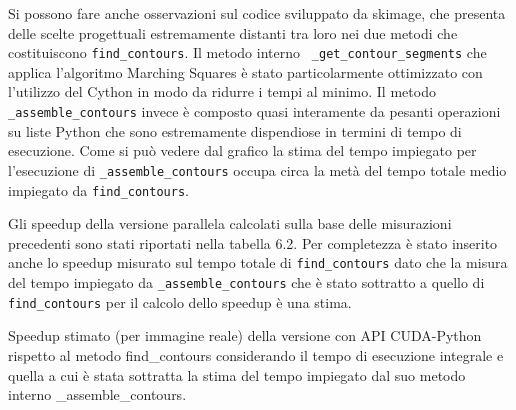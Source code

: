 \documentclass[12pt,a4paper]{report}
\begin{document}
{%
\begin{figure}[H]
\centering
\begin{floatrow}[1]
\end{floatrow}
\end{figure} 

Si possono fare anche osservazioni sul codice sviluppato da skimage, che presenta delle scelte progettuali estremamente distanti tra loro nei due metodi che costituiscono \verb|find_contours|. Il metodo interno \verb| _get_contour_segments| che applica l'algoritmo Marching Squares è stato particolarmente ottimizzato con l'utilizzo del Cython in modo da ridurre i tempi al minimo. Il metodo \verb|_assemble_contours| invece è composto quasi interamente da pesanti operazioni su liste Python che sono estremamente dispendiose in termini di tempo di esecuzione. Come si può vedere dal grafico la stima del tempo impiegato per l'esecuzione di \verb|_assemble_contours| occupa circa la metà del tempo totale medio impiegato da \verb|find_contours|.
\newpage

Gli speedup della versione parallela calcolati sulla base delle misurazioni precedenti sono stati riportati nella tabella 6.2. Per completezza è stato inserito anche lo speedup misurato sul tempo totale di \verb|find_contours| dato che la misura del tempo impiegato da \verb|_assemble_contours| che è stato sottratto a quello di \verb|find_contours| per il calcolo dello speedup è una stima.

\begin{table}[h]
\centering
\setlength\tabcolsep{0pt} %
\caption{Speedup stimato (per immagine reale) della versione con API CUDA-Python rispetto al metodo find\_contours considerando il tempo di esecuzione integrale e quella a cui è stata sottratta la stima del tempo impiegato dal suo metodo interno \_assemble\_contours.}
\label{t3}


\end{table}}
\end{document}
